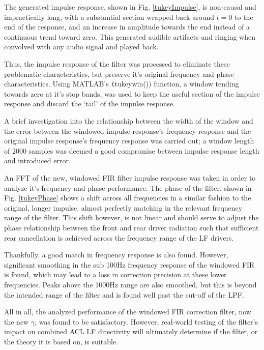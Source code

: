 \documentclass{report}
\begin{document}
            The generated impulse response, shown in Fig. \ref{tukeyImpulse}, is non-causal and impractically long, with a substantial section wrapped back around $t=0$ to the end of the response, and an increase in amplitude towards the end instead of a continuous trend toward zero.
            This generated audible artifacts and ringing when convolved with any audio signal and played back.

            Thus, the impulse response of the filter was processed to eliminate these problematic characteristics, but preserve it's original frequency and phase characteristics.
            Using MATLAB's \texttt(tukeywin()) function, a window tending towards zero at it's stop bands, was used to keep the useful section of the impulse response and discard the `tail' of the impulse response.

            A brief investigation into the relationship between the width of the window and the error between the windowed impulse response's frequency response and the original impulse response's frequency response was carried out; a window length of 2000 samples was deemed a good compromise between impulse response length and introduced error.

            An FFT of the new, windowed FIR filter impulse response was taken in order to analyze it's frequency and phase performance.
            The phase of the filter, shown in Fig. \ref{tukeyPhase} shows a shift across all frequencies in a similar fashion to the original, longer impulse, almost perfectly matching in the relevant frequency range of the filter.
            This shift however, is not linear and should serve to adjust the phase relationship between the front and rear driver radiation such that sufficient rear cancellation is achieved across the frequency range of the LF drivers.

            Thankfully, a good match in frequency response is also found.
            However, significant smoothing in the sub 100Hz frequency response of the windowed FIR is found, which may lead to a loss in correction precision at these lower frequencies.
            Peaks above the 1000Hz range are also smoothed, but this is beyond the intended range of the filter and is found well past the cut-off of the LPF.

            All in all, the analyzed performance of the windowed FIR correction filter, now the new $\gamma$, was found to be satisfactory.
            However, real-world testing of the filter's impact on combined ACL LF directivity will ultimately determine if the filter, or the theory it is based on, is suitable.
            
\end{document}

